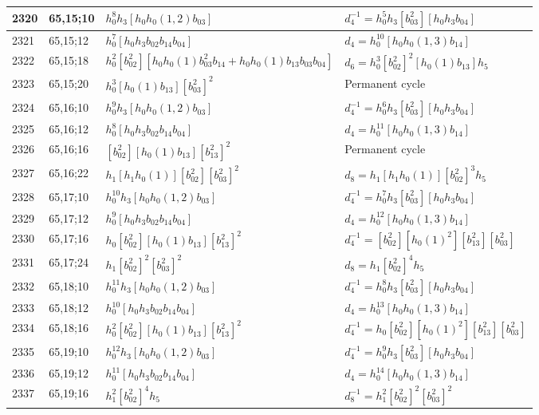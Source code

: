 \documentclass{article}
\begin{document}
\begin{longtable}{|l|l|>{\raggedright\arraybackslash}p{6cm}|>{\raggedright\arraybackslash}p{6cm}|}
\hline
2320 & 65,15;10 & $h_0^8h_3[h_0h_0(1, 2)b_{03}]$ & $d_{4}^{-1}=h_0^5h_3[b_{03}^2][h_0h_3b_{04}]$\\
\hline
2321 & 65,15;12 & $h_0^7[h_0h_3b_{02}b_{14}b_{04}]$ &$d_{4}=h_0^{10}[h_0h_0(1, 3)b_{14}]$\\
\hline
2322 & 65,15;18 & $h_0^2[b_{02}^2][h_0h_0(1)b_{03}^2b_{14} + h_0h_0(1)b_{13}b_{03}b_{04}]$ &$d_{6}=h_0^3[b_{02}^2]^2[h_0(1)b_{13}]h_5$\\
\hline
2323 & 65,15;20 & $h_0^3[h_0(1)b_{13}][b_{03}^2]^2$ & Permanent cycle\\
\hline
2324 & 65,16;10 & $h_0^9h_3[h_0h_0(1, 2)b_{03}]$ & $d_{4}^{-1}=h_0^6h_3[b_{03}^2][h_0h_3b_{04}]$\\
\hline
2325 & 65,16;12 & $h_0^8[h_0h_3b_{02}b_{14}b_{04}]$ &$d_{4}=h_0^{11}[h_0h_0(1, 3)b_{14}]$\\
\hline
2326 & 65,16;16 & $[b_{02}^2][h_0(1)b_{13}][b_{13}^2]^2$ & Permanent cycle\\
\hline
2327 & 65,16;22 & $h_1[h_1h_0(1)][b_{02}^2][b_{03}^2]^2$ &$d_{8}=h_1[h_1h_0(1)][b_{02}^2]^3h_5$\\
\hline
2328 & 65,17;10 & $h_0^{10}h_3[h_0h_0(1, 2)b_{03}]$ & $d_{4}^{-1}=h_0^7h_3[b_{03}^2][h_0h_3b_{04}]$\\
\hline
2329 & 65,17;12 & $h_0^9[h_0h_3b_{02}b_{14}b_{04}]$ &$d_{4}=h_0^{12}[h_0h_0(1, 3)b_{14}]$\\
\hline
2330 & 65,17;16 & $h_0[b_{02}^2][h_0(1)b_{13}][b_{13}^2]^2$ & $d_{4}^{-1}=[b_{02}^2][h_0(1)^2][b_{13}^2][b_{03}^2]$\\
\hline
2331 & 65,17;24 & $h_1[b_{02}^2]^2[b_{03}^2]^2$ &$d_{8}=h_1[b_{02}^2]^4h_5$\\
\hline
2332 & 65,18;10 & $h_0^{11}h_3[h_0h_0(1, 2)b_{03}]$ & $d_{4}^{-1}=h_0^8h_3[b_{03}^2][h_0h_3b_{04}]$\\
\hline
2333 & 65,18;12 & $h_0^{10}[h_0h_3b_{02}b_{14}b_{04}]$ &$d_{4}=h_0^{13}[h_0h_0(1, 3)b_{14}]$\\
\hline
2334 & 65,18;16 & $h_0^2[b_{02}^2][h_0(1)b_{13}][b_{13}^2]^2$ & $d_{4}^{-1}=h_0[b_{02}^2][h_0(1)^2][b_{13}^2][b_{03}^2]$\\
\hline
2335 & 65,19;10 & $h_0^{12}h_3[h_0h_0(1, 2)b_{03}]$ & $d_{4}^{-1}=h_0^9h_3[b_{03}^2][h_0h_3b_{04}]$\\
\hline
2336 & 65,19;12 & $h_0^{11}[h_0h_3b_{02}b_{14}b_{04}]$ &$d_{4}=h_0^{14}[h_0h_0(1, 3)b_{14}]$\\
\hline
2337 & 65,19;16 & $h_1^2[b_{02}^2]^4h_5$ & $d_{8}^{-1}=h_1^2[b_{02}^2]^2[b_{03}^2]^2$\\

\end{longtable}
\end{document}
